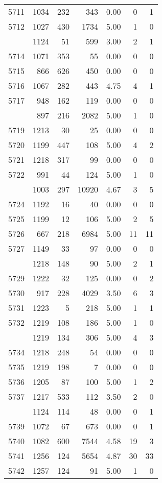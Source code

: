 \documentclass[
]{article}
\begin{document}
\begin{table}
\begin{tabular}[t]{lrrrrrr}
5711 & 1034 & 232 & 343 & 0.00 & 0 & 1\\
5712 & 1027 & 430 & 1734 & 5.00 & 1 & 0\\
\addlinespace
5713 & 1124 & 51 & 599 & 3.00 & 2 & 1\\
5714 & 1071 & 353 & 55 & 0.00 & 0 & 0\\
5715 & 866 & 626 & 450 & 0.00 & 0 & 0\\
5716 & 1067 & 282 & 443 & 4.75 & 4 & 1\\
5717 & 948 & 162 & 119 & 0.00 & 0 & 0\\
\addlinespace
5718 & 897 & 216 & 2082 & 5.00 & 1 & 0\\
5719 & 1213 & 30 & 25 & 0.00 & 0 & 0\\
5720 & 1199 & 447 & 108 & 5.00 & 4 & 2\\
5721 & 1218 & 317 & 99 & 0.00 & 0 & 0\\
5722 & 991 & 44 & 124 & 5.00 & 1 & 0\\
\addlinespace
5723 & 1003 & 297 & 10920 & 4.67 & 3 & 5\\
5724 & 1192 & 16 & 40 & 0.00 & 0 & 0\\
5725 & 1199 & 12 & 106 & 5.00 & 2 & 5\\
5726 & 667 & 218 & 6984 & 5.00 & 11 & 11\\
5727 & 1149 & 33 & 97 & 0.00 & 0 & 0\\
\addlinespace
5728 & 1218 & 148 & 90 & 5.00 & 2 & 1\\
5729 & 1222 & 32 & 125 & 0.00 & 0 & 2\\
5730 & 917 & 228 & 4029 & 3.50 & 6 & 3\\
5731 & 1223 & 5 & 218 & 5.00 & 1 & 1\\
5732 & 1219 & 108 & 186 & 5.00 & 1 & 0\\
\addlinespace
5733 & 1219 & 134 & 306 & 5.00 & 4 & 3\\
5734 & 1218 & 248 & 54 & 0.00 & 0 & 0\\
5735 & 1219 & 198 & 7 & 0.00 & 0 & 0\\
5736 & 1205 & 87 & 100 & 5.00 & 1 & 2\\
5737 & 1217 & 533 & 112 & 3.50 & 2 & 0\\
\addlinespace
5738 & 1124 & 114 & 48 & 0.00 & 0 & 1\\
5739 & 1072 & 67 & 673 & 0.00 & 0 & 1\\
5740 & 1082 & 600 & 7544 & 4.58 & 19 & 3\\
5741 & 1256 & 124 & 5654 & 4.87 & 30 & 33\\
5742 & 1257 & 124 & 91 & 5.00 & 1 & 0\\

\end{tabular}
\end{table}
\end{document}
